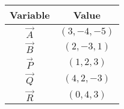 \begin{tabular}{|c|c|}
\hline
\textbf{Variable} & \textbf{Value} \\
\hline
$\vec{A}$ & $(3,-4,-5)$ \\
\hline
$\vec{B}$ & $(2,-3,1)$ \\
\hline
$\vec{P}$ & $(1,2,3)$ \\
\hline
$\vec{Q}$ & $(4,2,-3)$ \\
\hline
$\vec{R}$ & $(0,4,3)$ \\
\hline
\end{tabular}